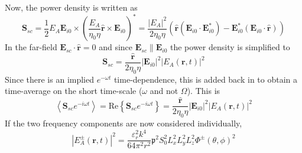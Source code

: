 \documentclass[10pt,a4paper,draft]{scrartcl}
\begin{document}
	Now, the power density is written as
	\begin{equation*}
		\bm{S}_{sc} = \frac{1}{2} E_A \bm{E}_{i0} \times \left( \frac{E_A}{ \eta_0 \eta} \bm{\hat{r}} \times \bm{E}_{i0} \right)^* = \frac{|E_A|^2}{2\eta_0 \eta} \left( \bm{\hat{r}} (\bm{E}_{i0} \cdot \bm{E}_{i0}^*) - \bm{E}_{i0}^* (\bm{E}_{i0} \cdot \bm{\hat{r}}) \right)
	\end{equation*}
	In the far-field $\bm{E}_{sc} \cdot \bm{\hat{r}} = 0$ and since $\bm{E}_{sc} \parallel \bm{E}_{i0}$ the power density is simplified to
	\begin{equation*}
	\bm{S}_{sc} = \frac{\bm{\hat{r}}}{2\eta_0 \eta} |\bm{E}_{i0}|^2 |E_A (\bm{r},t)|^2
	\end{equation*}
	Since there is an implied $e^{-\omega t}$ time-dependence, this is added back in to obtain a time-average on the short time-scale ($\omega$ and not $\Omega$). This is
	\begin{equation*}
		\left< \bm{S}_{sc} e^{-i\omega t} \right> = \mathrm{Re}\left\{ \bm{S}_{sc} e^{-i\omega t} \right\} = \frac{\bm{\hat{r}}}{2\eta_0 \eta} |\bm{E}_{i0}|^2 |E_A (\bm{r},t)|^2
	\end{equation*}
	If the two frequency components are now considered individually,
	\begin{equation*}
		|E_A^\pm (\bm{r},t)|^2 =\frac{\varepsilon_r^2 k^4}{64 \pi^2 r^2} \mathfrak{p}^2 S_0^2 L_x^2 L_y^2 L_z^2 \Phi^\pm (\theta,\phi)^2
	\end{equation*}
	
\end{document}
